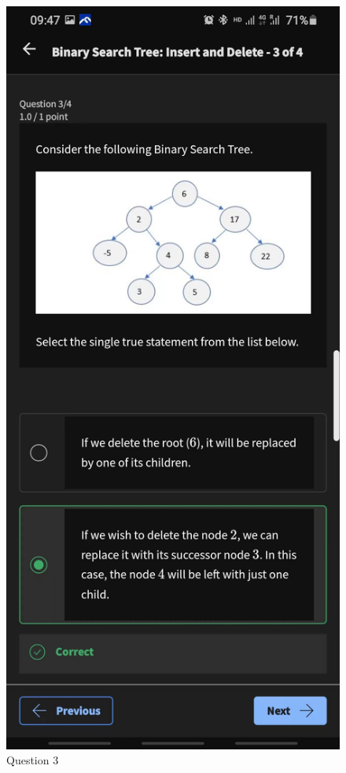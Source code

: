 \documentclass{article}
\begin{document}
\begin{figure}[H]
    \includegraphics[width=\textwidth]{bstinsertiondeletionquiz3.jpg}
    \caption{Question 3}
\end{figure}
\end{document}
